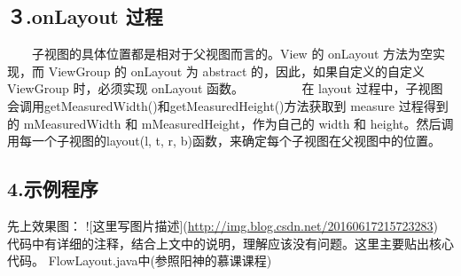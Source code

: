 \documentclass[9pt, b5paper]{article}
\begin{document}
\subsection{３.onLayout 过程}
\label{sec-11-3}
　　子视图的具体位置都是相对于父视图而言的。View 的 onLayout 方法为空实现，而 ViewGroup 的 onLayout 为 abstract 的，因此，如果自定义的自定义ViewGroup 时，必须实现 onLayout 函数。 
　　 
　　在 layout 过程中，子视图会调用getMeasuredWidth()和getMeasuredHeight()方法获取到 measure 过程得到的 mMeasuredWidth 和 mMeasuredHeight，作为自己的 width 和 height。然后调用每一个子视图的layout(l, t, r, b)函数，来确定每个子视图在父视图中的位置。
\subsection{4.示例程序}
\label{sec-11-4}
先上效果图：
![这里写图片描述](\url{http://img.blog.csdn.net/20160617215723283})
代码中有详细的注释，结合上文中的说明，理解应该没有问题。这里主要贴出核心代码。
FlowLayout.java中(参照阳神的慕课课程)
\end{document}
